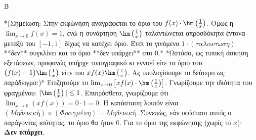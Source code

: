 \begin{thema}{Β}
\begin{erwthma}
\item 
*(Σημείωση: Στην εκφώνηση αναγράφεται το όριο του $f(x) \cdot \hm\left(\frac{1}{x}\right)$. Όμως η $\lim_{x\to0} f(x) = 1$, ενώ η συνάρτηση $\hm\left(\frac{1}{x}\right)$ ταλαντώνεται απροσδόκητα έντονα μεταξύ του $[-1, 1]$ δίχως να κατέχει όριο. Έτσι το γινόμενο $1 \cdot (\tau\alpha\lambda\alpha\nu\tau\omega\sigma\eta)$ **δεν** συγκλίνει και το όριο **δεν υπάρχει** στο 0.*
*Ωστόσο, ως τυπική άσκηση εξετάσεων, προφανώς υπήρχε τυπογραφικό κι εννοεί είτε το όριο του  $\big(f(x)-1\big)\hm\left(\frac{1}{x}\right)$ είτε του $x f(x)\hm\left(\frac{1}{x}\right)$. Ας υπολογίσουμε το δεύτερο ως παράδειγμα:)*
Επιζητούμε το $\lim_{x\to0} \left[ x f(x) \cdot \hm\left(\frac{1}{x}\right)\right]$.
Γνωρίζουμε την ιδιότητα του φραγμένου: $|\hm\left(\frac{1}{x}\right)| \le 1$.
Επιπρόσθετα, γνωρίζουμε ότι $\lim_{x\to0} (x f(x)) = 0 \cdot 1 = 0$.
Η κατάσταση λοιπόν είναι $(Μηδενική) \times (Φραγμένη) = Μηδενική$. Συνεπώς, εάν υφίστατο αυτός ο παράγοντας ισότητας, το όριο θα ήταν $0$. 
Για το όριο της εκφώνησης (χωρίς το $x$): \textbf{Δεν υπάρχει}.
\end{erwthma}
\end{thema}

